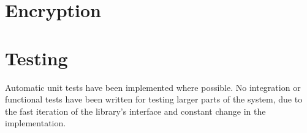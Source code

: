 \section{Encryption}


\section{Testing}
\label{sec:testing}
Automatic unit tests have been implemented where possible. No integration or functional tests have been written for testing larger parts of the system, due to the fast iteration of the library's interface and constant change in the implementation. 
